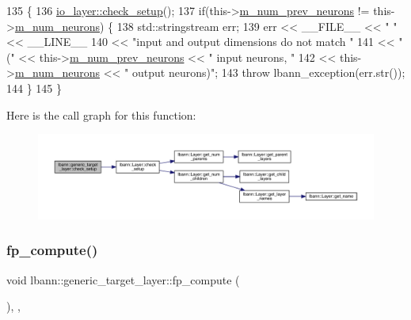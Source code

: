 \begin{DoxyCode}
135                               \{
136     \hyperlink{classlbann_1_1Layer_aeec1c710c3d53b5e43a4d4f67b0a21b2}{io\_layer::check\_setup}();
137     \textcolor{keywordflow}{if}(this->\hyperlink{classlbann_1_1Layer_ac7b30f4e28d58204bfcbb76886f9136d}{m\_num\_prev\_neurons} != this->\hyperlink{classlbann_1_1Layer_a6b5ebc8a7d9329d8a773ed787e7b41d8}{m\_num\_neurons}) \{
138       std::stringstream err;
139       err << \_\_FILE\_\_ << \textcolor{stringliteral}{" "} << \_\_LINE\_\_
140           << \textcolor{stringliteral}{"input and output dimensions do not match "}
141           << \textcolor{stringliteral}{"("} << this->\hyperlink{classlbann_1_1Layer_ac7b30f4e28d58204bfcbb76886f9136d}{m\_num\_prev\_neurons} << \textcolor{stringliteral}{" input neurons, "}
142           << this->\hyperlink{classlbann_1_1Layer_a6b5ebc8a7d9329d8a773ed787e7b41d8}{m\_num\_neurons} << \textcolor{stringliteral}{" output neurons)"};
143       \textcolor{keywordflow}{throw} lbann\_exception(err.str());
144     \}
145   \}
\end{DoxyCode}
Here is the call graph for this function\+:\nopagebreak
\begin{figure}[H]
\begin{center}
\leavevmode
\includegraphics[width=350pt]{classlbann_1_1generic__target__layer_a35375f4cf914ba5a308fdbd98c589408_cgraph}
\end{center}
\end{figure}
\mbox{\label{classlbann_1_1generic__target__layer_a57a60f5a28c9fb78d5151801123d4dba}} 
\subsubsection{\texorpdfstring{fp\+\_\+compute()}{fp\_compute()}}
{\footnotesize\ttfamily void lbann\+::generic\+\_\+target\+\_\+layer\+::fp\+\_\+compute (\begin{DoxyParamCaption}{ }\end{DoxyParamCaption})\hspace{0.3cm}{\ttfamily [inline]}, {\ttfamily [override]}, {\ttfamily [virtual]}}

